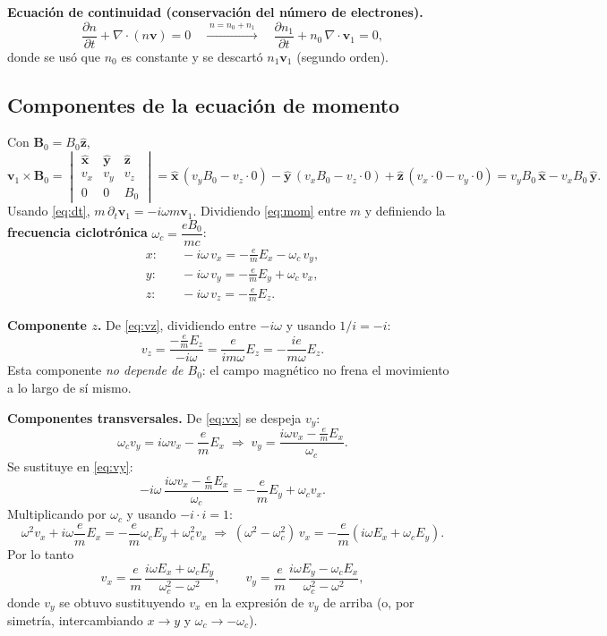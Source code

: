 \documentclass[11pt,a4paper]{article}
\newcommand{\B}{\mathbf{B}}
\newcommand{\vv}{\mathbf{v}}
\newcommand{\wc}{\omega_c}
\newcommand{\zz}{\hat{\mathbf{z}}}
\newcommand{\xx}{\hat{\mathbf{x}}}
\newcommand{\yy}{\hat{\mathbf{y}}}
\begin{document}
\textbf{Ecuación de continuidad (conservación del número de electrones).}
\[
\frac{\partial n}{\partial t}+\nabla\cdot(n\vv)=0
\quad\xrightarrow{\;n=n_0+n_1\;}\quad
\frac{\partial n_1}{\partial t}+n_0\,\nabla\cdot\vv_1=0,
\]
donde se usó que $n_0$ es constante y se descartó $n_1\vv_1$ (segundo orden).

\subsection{Componentes de la ecuación de momento}

Con $\B_0=B_0\zz$,
\[
\vv_1\times\B_0=
\begin{vmatrix}\xx&\yy&\zz\\ v_x&v_y&v_z\\ 0&0&B_0\end{vmatrix}
=\xx\,(v_yB_0-v_z\cdot 0)-\yy\,(v_xB_0-v_z\cdot0)+\zz\,(v_x\cdot0-v_y\cdot0)
=v_yB_0\,\xx-v_xB_0\,\yy .
\]
Usando \eqref{eq:dt}, $m\,\partial_t\vv_1=-i\omega m\vv_1$. Dividiendo \eqref{eq:mom} entre $m$ y definiendo la \textbf{frecuencia ciclotrónica} $\wc=\dfrac{eB_0}{mc}$:
\begin{align}
x:&\quad -i\omega\, v_x=-\frac{e}{m}E_x-\wc\, v_y, \label{eq:vx}\\
y:&\quad -i\omega\, v_y=-\frac{e}{m}E_y+\wc\, v_x, \label{eq:vy}\\
z:&\quad -i\omega\, v_z=-\frac{e}{m}E_z. \label{eq:vz}
\end{align}

\textbf{Componente $z$.} De \eqref{eq:vz}, dividiendo entre $-i\omega$ y usando $1/i=-i$:
\begin{equation}
v_z=\frac{-\frac{e}{m}E_z}{-i\omega}=\frac{e}{i m\omega}E_z=-\frac{ie}{m\omega}E_z .
\label{eq:vzsol}
\end{equation}
Esta componente \emph{no depende de $B_0$}: el campo magnético no frena el movimiento a lo largo de sí mismo.

\textbf{Componentes transversales.} De \eqref{eq:vx} se despeja $v_y$:
\[
\wc v_y = i\omega v_x-\frac{e}{m}E_x \;\Rightarrow\; v_y=\frac{i\omega v_x-\frac{e}{m}E_x}{\wc}.
\]
Se sustituye en \eqref{eq:vy}:
\[
-i\omega\,\frac{i\omega v_x-\frac{e}{m}E_x}{\wc}=-\frac{e}{m}E_y+\wc v_x .
\]
Multiplicando por $\wc$ y usando $-i\cdot i=1$:
\[
\omega^2 v_x+i\omega\frac{e}{m}E_x=-\frac{e}{m}\wc E_y+\wc^2 v_x
\;\Rightarrow\;
(\omega^2-\wc^2)\,v_x=-\frac{e}{m}\left(i\omega E_x+\wc E_y\right).
\]
Por lo tanto
\begin{equation}
v_x=\frac{e}{m}\,\frac{i\omega E_x+\wc E_y}{\wc^2-\omega^2},
\qquad
v_y=\frac{e}{m}\,\frac{i\omega E_y-\wc E_x}{\wc^2-\omega^2},
\label{eq:vperp}
\end{equation}
donde $v_y$ se obtuvo sustituyendo $v_x$ en la expresión de $v_y$ de arriba (o, por simetría, intercambiando $x\to y$ y $\wc\to-\wc$).
\end{document}
